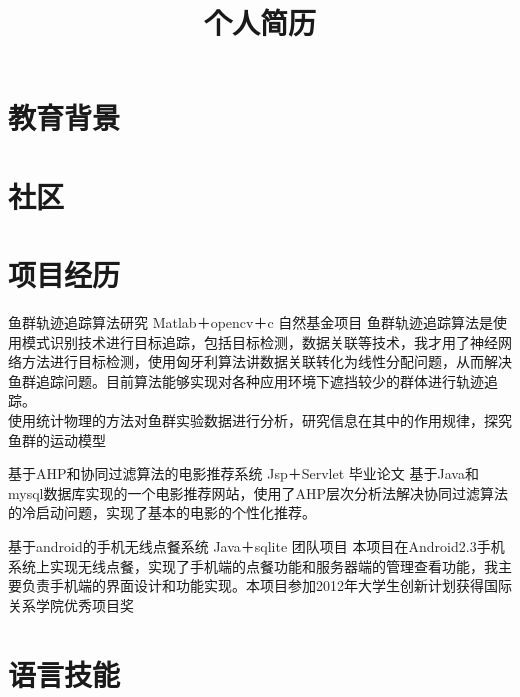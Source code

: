 \documentclass[11pt,a4paper]{moderncv}
\title{个人简历}                      %
\begin{document}
\maketitle

\section{教育背景}


\section{社区}

\section{项目经历}
\renewcommand{\baselinestretch}{1.2}

{鱼群轨迹追踪算法研究}
{Matlab＋opencv＋c}
{自然基金项目}{}
{鱼群轨迹追踪算法是使用模式识别技术进行目标追踪，包括目标检测，数据关联等技术，我才用了神经网络方法进行目标检测，使用匈牙利算法讲数据关联转化为线性分配问题，从而解决鱼群追踪问题。目前算法能够实现对各种应用环境下遮挡较少的群体进行轨迹追踪。
\\使用统计物理的方法对鱼群实验数据进行分析，研究信息在其中的作用规律，探究鱼群的运动模型
}

{基于AHP和协同过滤算法的电影推荐系统}
{Jsp＋Servlet}
{毕业论文}{}
{基于Java和mysql数据库实现的一个电影推荐网站，使用了AHP层次分析法解决协同过滤算法的冷启动问题，实现了基本的电影的个性化推荐。}

{基于android的手机无线点餐系统}
{Java＋sqlite}
{团队项目}{}
{本项目在Android2.3手机系统上实现无线点餐，实现了手机端的点餐功能和服务器端的管理查看功能，我主要负责手机端的界面设计和功能实现。本项目参加2012年大学生创新计划获得国际关系学院优秀项目奖}

\section{语言技能}
\end{document}
